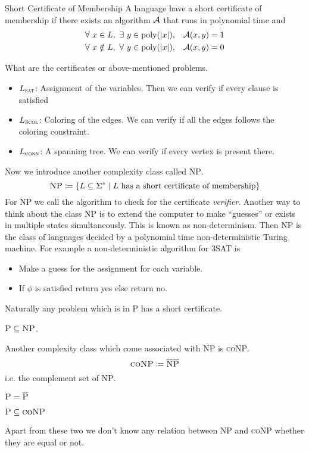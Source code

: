 \begin{Definition}{Short Certificate of Membership}{}
    A language have a short certificate of membership if there exists an algorithm $\mathcal{A}$ that runs in polynomial time and \begin{align*}
        \forall\ x\in L,\ \exists\ y\in \text{poly}(|x|),       & \quad \mathcal{A}(x,y)=1  \\
        \forall\ x\notin L,\ \forall\ y\in \text{poly}(|x|), & \quad  \mathcal{A}(x,y)=0
    \end{align*}
\end{Definition}
What are the certificates or above-mentioned problems.   \begin{itemize}
    \item $L_{\textsc{sat}}$: Assignment of the variables. Then we can verify if every clause is satisfied
    \item $L_{\textsc{3col}}$: Coloring of the edges.  We can verify if all the edges follows the coloring constraint.
    \item $L_{\textsc{conn}}$: A spanning tree. We can verify if every vertex is present there.
\end{itemize}

Now we introduce another complexity class called \textsc{NP}. $$\textsc{NP}\coloneqq \{L\subseteq \Sigma^*\mid L\text{ has a short certificate of membership}\}$$For \textsc{NP} we call the algorithm to check for the certificate \emph{verifier}.  Another way to think about the class \textsc{NP} is to extend the computer to make ``guesses'' or exists in multiple states simultaneously. This is known as non-determinism. Then \textsc{NP} is the class of languages decided by a polynomial time non-deterministic Turing machine. For example a non-deterministic algorithm for \textsc{3SAT} is \begin{itemize}
    \item Make a guess for the assignment for each variable.
    \item If $\phi$ is satisfied return yes else return no.
\end{itemize}\parinf Naturally any problem which is in \textsc{P} has a short certificate. \begin{Theorem}{}{}
    $\textsc{P}\subseteq \textsc{NP}$.
\end{Theorem}\parinn
Another complexity class which come associated with \textsc{NP} is \textsc{coNP}. $$\textsc{coNP}\coloneqq \overline{\textsc{NP}}$$i.e. the complement set of \textsc{NP}.
\begin{observation}
    $\textsc{P}=\overline{\textsc{P}}$
\end{observation}
\begin{Theorem}{}{}
    $\textsc{P}\subseteq \textsc{coNP}$
\end{Theorem}
Apart from these two we don't know any relation between \textsc{NP} and \textsc{coNP} whether they are equal or not.
